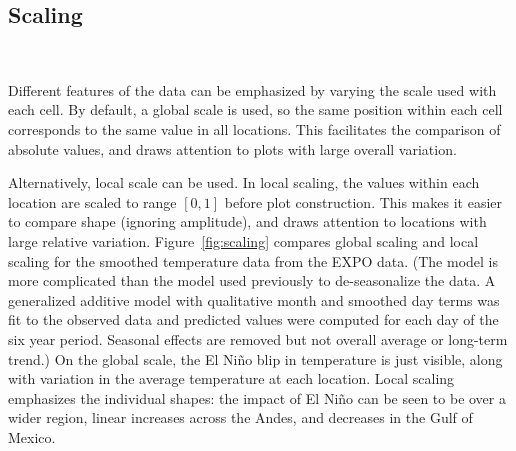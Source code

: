 \documentclass[oneside]{article}
\begin{document}




\subsection{Scaling}~\label{sec:scale}


Different features of the data can be emphasized by varying the scale used with each cell. By default, a global scale is used, so the same position within each cell corresponds to the same value in all locations. This facilitates the comparison of absolute values, and draws attention to plots with large overall variation.

Alternatively, local scale can be used. In local scaling, the values within each location are scaled to range $[0, 1]$ before plot construction. This makes it easier to compare shape (ignoring amplitude), and draws attention to locations with large relative variation. Figure~\ref{fig:scaling} compares global scaling and local scaling for the smoothed temperature data from the EXPO data. (The model is more complicated than the model used previously to de-seasonalize the data. A generalized additive model \citep{wood:2006} with qualitative month and smoothed day terms was fit to the observed data and predicted values were computed for each day of the six year period. Seasonal effects are removed but not overall average or long-term trend.) On the global scale, the El Ni\~no blip in temperature is just visible, along with variation in the average temperature at each location. Local scaling emphasizes the individual shapes: the impact of El Ni\~no can be seen to be over a wider region, linear increases across the Andes, and decreases in the Gulf of Mexico.
\end{document}
